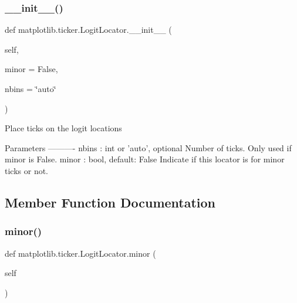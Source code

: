 \subsubsection{\texorpdfstring{\+\_\+\+\_\+init\+\_\+\+\_\+()}{\_\_init\_\_()}}
{\footnotesize\ttfamily def matplotlib.\+ticker.\+Logit\+Locator.\+\_\+\+\_\+init\+\_\+\+\_\+ (\begin{DoxyParamCaption}\item[{}]{self,  }\item[{}]{minor = {\ttfamily False},  }\item[{}]{nbins = {\ttfamily \char`\"{}auto\char`\"{}} }\end{DoxyParamCaption})}

\begin{DoxyVerb}Place ticks on the logit locations

Parameters
----------
nbins : int or 'auto', optional
    Number of ticks. Only used if minor is False.
minor : bool, default: False
    Indicate if this locator is for minor ticks or not.
\end{DoxyVerb}
 

\subsection{Member Function Documentation}
\mbox{\label{classmatplotlib_1_1ticker_1_1LogitLocator_a2c28a8952a6a118529210a24cc4db54e}} 
\subsubsection{\texorpdfstring{minor()}{minor()}\hspace{0.1cm}{\footnotesize\ttfamily [1/2]}}
{\footnotesize\ttfamily def matplotlib.\+ticker.\+Logit\+Locator.\+minor (\begin{DoxyParamCaption}\item[{}]{self }\end{DoxyParamCaption})}

\mbox{\label{classmatplotlib_1_1ticker_1_1LogitLocator_a33c0858b733e62bc5239318c37c0d153}} 
